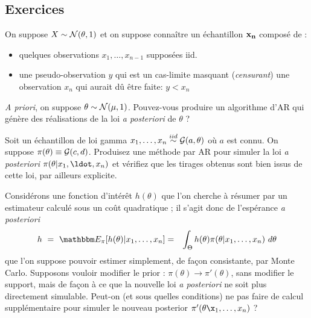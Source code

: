 \documentclass[10pt]{article}
\begin{document}

\subsection{Exercices}

\if{} \vspace{1cm} 
\begin{exec}\label{quasi.conjug}
 On suppose $X   \sim {\cal{N}}(\theta,1)$ et on suppose connaître un échantillon ${\bf x_n}$ composé de :
\begin{itemize}
\item quelques observations $x_1,\ldots,x_{n-1}$ supposées iid. 
\item une pseudo-observation $y$ qui est un cas-limite masquant ({\it censurant}) une observation $x_{n}$ qui aurait dû être faite: $y<x_{n}$
\end{itemize}
 {\it A priori}, on suppose $\theta \sim {\cal{N}}(\mu,1)$. 
Pouvez-vous produire un algorithme d'AR qui génère des réalisations de la loi {\it a posteriori} de $\theta$ ? 
\end{exec}


\clearpage
\fi

\if{} \vspace{1cm}
\begin{exec}\label{gamma}
Soit un échantillon de loi gamma $x_1,\ldots,x_n\overset{iid}{\sim} {\cal{G}}(a,\theta)$ où $a$ est connu. On suppose $\pi(\theta)\equiv {\cal{G}}(c,d)$. Produisez une méthode par AR pour simuler la loi {\it a posteriori} $\pi(\theta|x_1,\ldot,x_n)$ et vérifiez que les tirages obtenus sont bien issus de cette loi, par ailleurs explicite.
\end{exec}

 
\fi

\if{} \vspace{1cm} 
\begin{exec}
Considérons une fonction d'intérêt $h(\theta)$ que l'on cherche à résumer par un estimateur calculé sous un coût quadratique ; il s'agit donc de l'espérance {\it a posteriori}
\begin{eqnarray}
h \ = \ \E_{\pi}[h(\theta)|x_1,\ldots,x_n] & = & \int_{\Theta} h(\theta)\pi(\theta|x_1,\ldots,x_n) \ d\theta\label{IS.estim1}
\end{eqnarray}
que l'on suppose pouvoir estimer simplement, de fa\c con consistante, par Monte Carlo. Supposons vouloir modifier le prior : $\pi(\theta)\to\pi'(\theta)$, sans modifier le support, mais de fa\c con à ce que la nouvelle loi {\it a posteriori} ne soit plus directement simulable. Peut-on (et sous quelles conditions) ne pas faire de calcul supplémentaire pour simuler le nouveau posterior $\pi'(\theta\x_1,\ldots,x_n)$ ?
\end{exec}
\end{document}
